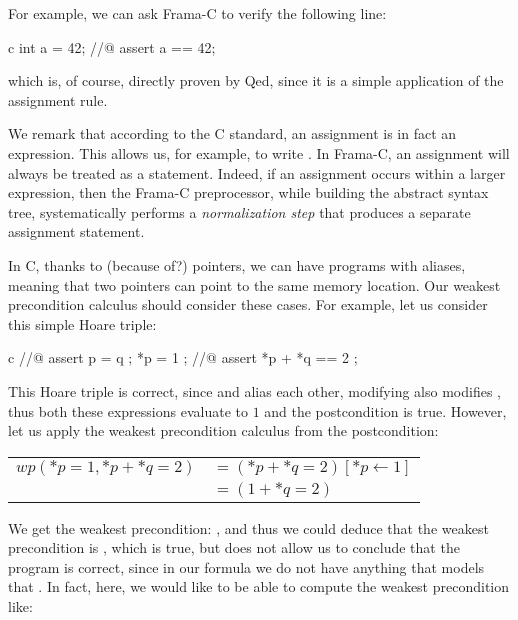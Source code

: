 For example, we can ask Frama-C to verify the following line:
\begin{CodeBlock}{c}
int a = 42;
//@ assert a == 42;
\end{CodeBlock}
which is, of course, directly proven by Qed, since it is a simple
application of the assignment rule.



\begin{Information}
  We remark that according to the C standard, an assignment is in fact an
  expression. This allows us, for example, to write
  .
  In Frama-C, an assignment will always be treated as a statement. Indeed,
  if an assignment occurs within a larger expression, then the Frama-C
  preprocessor, while building the abstract syntax tree, systematically
  performs a \emph{normalization step} that produces a separate assignment
  statement.
\end{Information}






In C, thanks to (because of?) pointers, we can have programs with aliases,
meaning that two pointers can point to the same memory location. Our weakest
precondition calculus should consider these cases. For example, let us consider
this simple Hoare triple:


\begin{CodeBlock}{c}
//@ assert p = q ;
*p = 1 ;
//@ assert *p + *q == 2 ;
\end{CodeBlock}



This Hoare triple is correct, since  and  
alias each other, modifying  also modifies , thus both these
expressions evaluate to $1$ and the postcondition is true. However, let us apply
the weakest precondition calculus from the postcondition:



\begin{tabular}{ll}
$wp(*p = 1, *p + *q = 2)$ & $= (*p + *q = 2)[*p \leftarrow 1]$\\
                          & $= (1 + *q = 2)$
\end{tabular}



We get the weakest precondition: , and thus we could
deduce that the weakest precondition is , which is true, but
does not allow us to conclude that the program is correct, since in our formula
we do not have anything that models that . In
fact, here, we would like to be able to compute the weakest precondition like:



